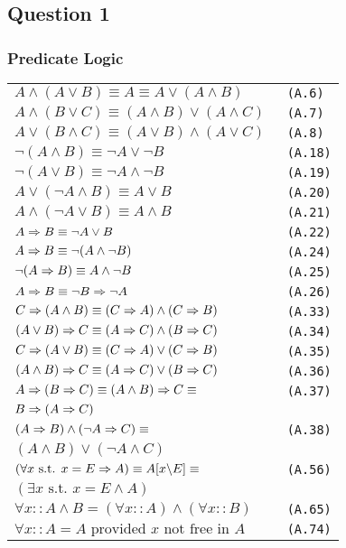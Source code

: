 \subsection{Question 1}

\subsubsection{Predicate Logic}

\begin{tabular}{@{}ll@{}}
\fontsize{5pt}{6pt}\selectfont
$ A \land (A \lor B) \equiv A \equiv A \lor (A \land B)$ & \verb! (A.6)! \\
$ A \land (B \lor C) \equiv (A \land B) \lor (A \land C)$ & \verb! (A.7)! \\
$ A \lor (B \land C) \equiv (A \lor B) \land (A \lor C)$ & \verb! (A.8)! \\
$ \neg (A \land B) \equiv \neg A \lor \neg B$ & \verb! (A.18)! \\
$ \neg (A \lor B) \equiv \neg A \land \neg B$ & \verb! (A.19)! \\
$ A \lor (\neg A \land B) \equiv A \lor B$ & \verb! (A.20)! \\
$ A \land (\neg A \lor B) \equiv A \land B$ & \verb! (A.21)! \\
$ A \Rightarrow B \equiv \neg A \lor B$ & \verb! (A.22)! \\
$ A \Rightarrow B \equiv \neg(A \land \neg B)$ & \verb! (A.24)! \\
$ \neg(A \Rightarrow B) \equiv A \land \neg B$ & \verb! (A.25)! \\
$ A \Rightarrow B \equiv \neg B \Rightarrow \neg A$ & \verb! (A.26)! \\
$ C \Rightarrow (A \land B) \equiv (C \Rightarrow A) \land (C \Rightarrow B)$ & \verb! (A.33)! \\
$ (A \lor B) \Rightarrow C \equiv (A \Rightarrow C) \land (B \Rightarrow C)$ & \verb! (A.34)! \\
$ C \Rightarrow (A \lor B) \equiv (C \Rightarrow A) \lor (C \Rightarrow B)$ & \verb! (A.35)! \\
$ (A \land B) \Rightarrow C \equiv (A \Rightarrow C) \lor (B \Rightarrow C)$ & \verb! (A.36)! \\
$ A \Rightarrow (B \Rightarrow C) \equiv (A \land B) \Rightarrow C \equiv$ & \verb! (A.37)! \\
$ B \Rightarrow (A \Rightarrow C)$ & \\
$ (A \Rightarrow B) \land (\neg A \Rightarrow C) \equiv$ & \verb! (A.38)! \\
$ (A \land B) \lor (\neg A \land C)$ & \\
$ (\forall x \text{ s.t. } x = E \Rightarrow A) \equiv A[x \backslash E] \equiv $ & \verb! (A.56)! \\
$ (\exists x \text{ s.t. } x = E \land A)$ & \\
$ \forall x :: A \land B = (\forall x :: A) \land (\forall x :: B)$ & \verb! (A.65)! \\
$ \forall x :: A = A \text{ provided } x \text{ not free in } A$ & \verb! (A.74)! \\
\end{tabular}

